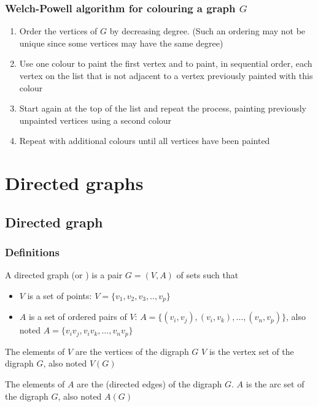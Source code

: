 \documentclass[aspectratio=43]{beamer}
\begin{document}
\begin{frame}\frametitle{Welch-Powell algorithm for colouring a graph $G$}
	\begin{enumerate}
	\item Order the vertices of $G$ by decreasing degree. (Such an ordering may not be unique since some vertices may have the same degree)
	\vfill
	\item Use one colour to paint the first vertex and to paint, in sequential order, each vertex on the list that is not adjacent to a vertex previously painted with this colour
	\vfill
	\item Start again at the top of the list and repeat the process, painting previously unpainted vertices using a second colour
	\vfill
	\item Repeat with additional colours until all vertices have been painted
\end{enumerate}\end{frame}
	
	


\section{Directed graphs}


\subsection{Directed graph}
\begin{frame} \frametitle{Definitions} 
\begin{definition}[{Digraph}]
A directed graph (or ) is a pair $G=(V,A)$ of sets such that
\begin{itemize}
\item $V$ is a set of points:  $V=\{v_1,v_2,v_3,..,v_p\}$
\item $A$ is a set of ordered pairs of $V$: $A=\{(v_i,v_j),(v_i,v_k),\dots,(v_n,v_p)\}$, also noted $A=\{v_iv_j,v_iv_k,\dots,v_nv_p\}$
\end{itemize}
\end{definition}
\begin{definition}[{Vertex}]
The elements of $V$ are the vertices of the digraph $G$
$V$ is the vertex set of the digraph $G$, also noted $V(G)$
\end{definition}
\begin{definition}[{Arc}]
The elements of $A$ are the  (directed edges) of the digraph $G$.
$A$ is the arc set of the digraph $G$, also noted $A(G)$
\end{definition}
\end{frame}
\end{document}
